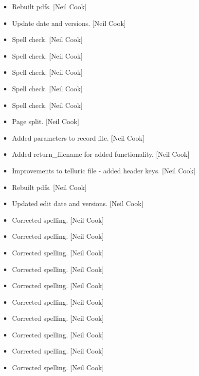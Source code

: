 \documentclass[a4paper,10pt,english]{report}
\begin{document}
\begin{itemize}
\item {} 
Rebuilt pdfs. {[}Neil Cook{]}

\item {} 
Update date and versions. {[}Neil Cook{]}

\item {} 
Spell check. {[}Neil Cook{]}

\item {} 
Spell check. {[}Neil Cook{]}

\item {} 
Spell check. {[}Neil Cook{]}

\item {} 
Spell check. {[}Neil Cook{]}

\item {} 
Spell check. {[}Neil Cook{]}

\item {} 
Page split. {[}Neil Cook{]}

\item {} 
Added parameters to record file. {[}Neil Cook{]}

\item {} 
Added return\_filename for added functionality. {[}Neil Cook{]}

\item {} 
Improvements to telluric file - added header keys. {[}Neil Cook{]}

\item {} 
Rebuilt pdfs. {[}Neil Cook{]}

\item {} 
Updated edit date and versions. {[}Neil Cook{]}

\item {} 
Corrected spelling. {[}Neil Cook{]}

\item {} 
Corrected spelling. {[}Neil Cook{]}

\item {} 
Corrected spelling. {[}Neil Cook{]}

\item {} 
Corrected spelling. {[}Neil Cook{]}

\item {} 
Corrected spelling. {[}Neil Cook{]}

\item {} 
Corrected spelling. {[}Neil Cook{]}

\item {} 
Corrected spelling. {[}Neil Cook{]}

\item {} 
Corrected spelling. {[}Neil Cook{]}

\item {} 
Corrected spelling. {[}Neil Cook{]}

\item {} 
Corrected spelling. {[}Neil Cook{]}

\end{itemize}
\end{document}
